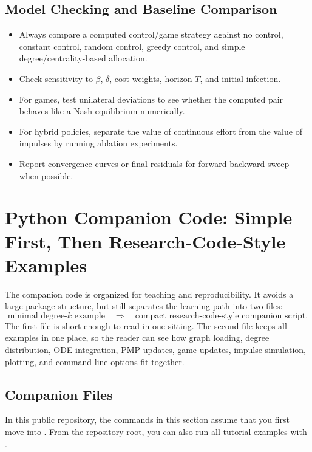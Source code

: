 \documentclass[11pt,a4paper]{article}
\begin{document}
\subsection{Model Checking and Baseline Comparison}

\begin{itemize}
  \item Always compare a computed control/game strategy against no control, constant control, random control, greedy control, and simple degree/centrality-based allocation.
  \item Check sensitivity to $\beta$, $\delta$, cost weights, horizon $T$, and initial infection.
  \item For games, test unilateral deviations to see whether the computed pair behaves like a Nash equilibrium numerically.
  \item For hybrid policies, separate the value of continuous effort from the value of impulses by running ablation experiments.
  \item Report convergence curves or final residuals for forward-backward sweep when possible.
\end{itemize}




\section{Python Companion Code: Simple First, Then Research-Code-Style Examples}

The companion code is organized for teaching and reproducibility.  It avoids a large package structure, but still separates the learning path into two files:
\[
\text{minimal degree-}k\text{ example} \quad \Longrightarrow \quad \text{compact research-code-style companion script}.
\]
The first file is short enough to read in one sitting.  The second file keeps all examples in one place, so the reader can see how graph loading, degree distribution, ODE integration, PMP updates, game updates, impulse simulation, plotting, and command-line options fit together.

\subsection{Companion Files}

In this public repository, the commands in this section assume that you first move into . From the repository root, you can also run all tutorial examples with .
\end{document}
